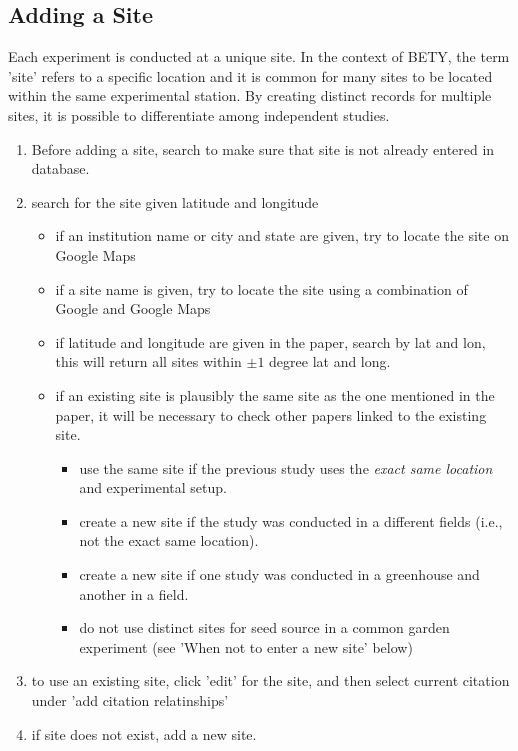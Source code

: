 \documentclass[12pt,english,portrait]{article}
\begin{document}
\subsection{Adding a Site}
 Each experiment is conducted at a unique site.
 In the context of BETY, the term 'site' refers to a specific location and it is common for many sites to be located within the same experimental station.
 By creating distinct records for multiple sites, it is possible to differentiate among independent studies.  

\begin{enumerate}
\item Before adding a site, search to make sure that site is not already entered in database.
\item search for the site given latitude and longitude
  \begin{itemize}
  \item if an institution name or city and state are given, try to locate the site on Google Maps
  \item if a site name is given, try to locate the site using a combination of Google and Google Maps
  \item if latitude and longitude are given in the paper, search by lat and lon, this will return all sites within $\pm1$ degree lat and long.
  \item if an existing site is plausibly the same site as the one mentioned in the paper, it will be necessary to check other papers linked to the existing site. 
    \begin{itemize}
    \item use the same site if the previous study uses the \emph{exact same location} and experimental setup. 
    \item create a new site if the study was conducted in a different fields (i.e., not the exact same location).
    \item create a new site if one study was conducted in a greenhouse and another in a field.
    \item do not use distinct sites for seed source in a common garden experiment (see 'When not to enter a new site' below) 
    \end{itemize}  
  \end{itemize} 
\item to use an existing site, click 'edit' for the site, and then select current citation under 'add citation relatinships' 
\item if site does not exist, add a new site.
\end{enumerate}
\end{document}

